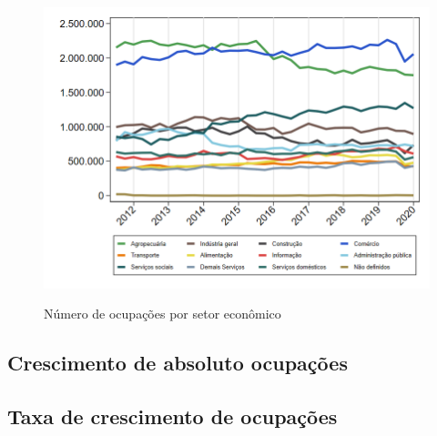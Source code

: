 \documentclass[10pt]{beamer}
\begin{document}
\begin{frame}
\textit{\hyperlink{indice_principal_amz}{}}
\begin{figure}
  \centering
  \includegraphics[width=.85\linewidth]{./../analysis/output/_importancia_relativa.png}
  \label{_importancia_relativa}
  \caption{{Número de ocupações por setor econômico}}
\end{figure}
\end{frame}

\subsection{Crescimento de absoluto ocupações}

\begin{frame}
\textit{\hyperlink{indice_principal_amz}{}}

\end{frame}


\begin{frame}
\textit{\hyperlink{indice_principal_amz}{}}

\end{frame}


\begin{frame}
\textit{\hyperlink{indice_principal_amz}{}}

\end{frame}

\subsection{Taxa de crescimento de ocupações}

\begin{frame}
\textit{\hyperlink{indice_principal_amz}{}}

\end{frame}
\end{document}
